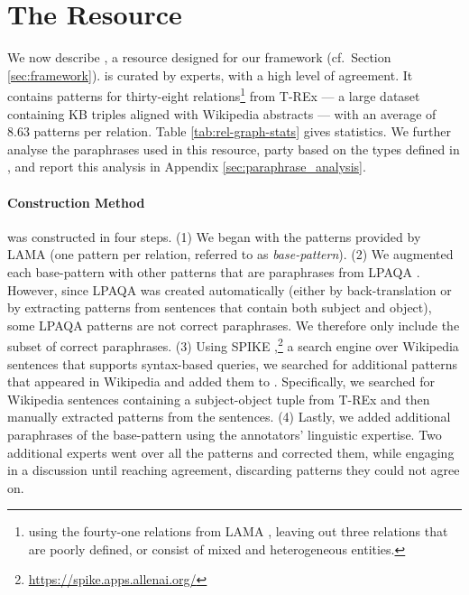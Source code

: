 \section{The \resource{} Resource}
\label{sec:rel-graph}

We now describe \resource{}, a resource designed for our framework (cf.\ Section \ref{sec:framework}).
\resource{} is curated by experts, with a high level of agreement.
It contains patterns for thirty-eight relations\footnote{using the fourty-one relations from LAMA \cite{lama}, leaving out three relations that are poorly defined, or consist of mixed and heterogeneous entities.} from T-REx \cite{trex} --- a large dataset containing KB triples aligned with Wikipedia abstracts --- with an average of 8.63 patterns per relation.
Table \ref{tab:rel-graph-stats} gives statistics.
We further analyse the paraphrases used in this resource, party based on the types defined in \citet{what_is_paraphrase}, and report this analysis in Appendix \ref{sec:paraphrase_analysis}.


\paragraph{Construction Method}
\resource{} was constructed in four steps. (1) We began with
the patterns provided by LAMA \cite{lama} (one pattern per
relation, referred to as \textit{base-pattern}). (2) We augmented each base-pattern with other patterns that are paraphrases from
LPAQA \cite{alpaqa}. However, since LPAQA was
created automatically (either by back-translation or by extracting patterns from sentences that contain both subject and object), some LPAQA patterns are not
correct paraphrases.
We therefore only include the subset of correct paraphrases.
(3) Using SPIKE
\cite{spike},\footnote{\url{https://spike.apps.allenai.org/}}
a search engine over Wikipedia sentences that supports
syntax-based queries, we searched for additional patterns
that appeared in Wikipedia and added them to 
\resource{}. Specifically, we searched for Wikipedia sentences
containing a  subject-object
tuple from T-REx and then manually extracted 
patterns from the sentences. (4) Lastly, we added
additional paraphrases of the base-pattern
using the annotators' linguistic expertise. Two additional
experts went over all the patterns and corrected them, while
engaging in a discussion until reaching agreement,
discarding patterns they could not agree on.

